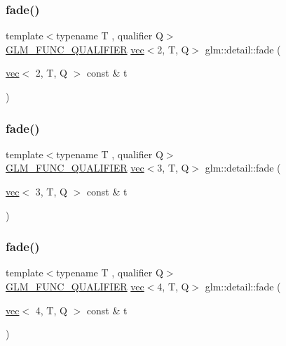 \subsubsection{\texorpdfstring{fade()}{fade()}\hspace{0.1cm}{\footnotesize\ttfamily [1/3]}}
{\footnotesize\ttfamily template$<$typename T , qualifier Q$>$ \\
\mbox{\hyperlink{setup_8hpp_a33fdea6f91c5f834105f7415e2a64407}{G\+L\+M\+\_\+\+F\+U\+N\+C\+\_\+\+Q\+U\+A\+L\+I\+F\+I\+ER}} \mbox{\hyperlink{structglm_1_1vec}{vec}}$<$2, T, Q$>$ glm\+::detail\+::fade (\begin{DoxyParamCaption}\item[{\mbox{\hyperlink{structglm_1_1vec}{vec}}$<$ 2, T, Q $>$ const \&}]{t }\end{DoxyParamCaption})}

\mbox{\label{namespaceglm_1_1detail_afaca75ccf77b14b266db747f83adb11a}} 
\subsubsection{\texorpdfstring{fade()}{fade()}\hspace{0.1cm}{\footnotesize\ttfamily [2/3]}}
{\footnotesize\ttfamily template$<$typename T , qualifier Q$>$ \\
\mbox{\hyperlink{setup_8hpp_a33fdea6f91c5f834105f7415e2a64407}{G\+L\+M\+\_\+\+F\+U\+N\+C\+\_\+\+Q\+U\+A\+L\+I\+F\+I\+ER}} \mbox{\hyperlink{structglm_1_1vec}{vec}}$<$3, T, Q$>$ glm\+::detail\+::fade (\begin{DoxyParamCaption}\item[{\mbox{\hyperlink{structglm_1_1vec}{vec}}$<$ 3, T, Q $>$ const \&}]{t }\end{DoxyParamCaption})}

\mbox{\label{namespaceglm_1_1detail_afcf366be6c9ccc0ab6166b7d4b2edea2}} 
\subsubsection{\texorpdfstring{fade()}{fade()}\hspace{0.1cm}{\footnotesize\ttfamily [3/3]}}
{\footnotesize\ttfamily template$<$typename T , qualifier Q$>$ \\
\mbox{\hyperlink{setup_8hpp_a33fdea6f91c5f834105f7415e2a64407}{G\+L\+M\+\_\+\+F\+U\+N\+C\+\_\+\+Q\+U\+A\+L\+I\+F\+I\+ER}} \mbox{\hyperlink{structglm_1_1vec}{vec}}$<$4, T, Q$>$ glm\+::detail\+::fade (\begin{DoxyParamCaption}\item[{\mbox{\hyperlink{structglm_1_1vec}{vec}}$<$ 4, T, Q $>$ const \&}]{t }\end{DoxyParamCaption})}

